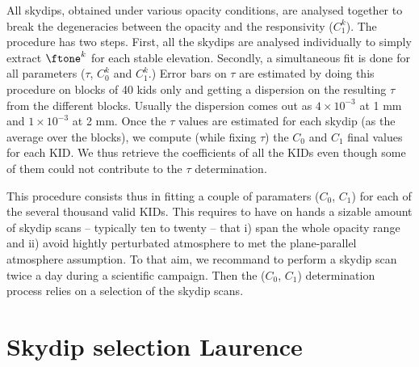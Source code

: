 All skydips, obtained under various opacity
conditions, are analysed together to break the degeneracies between
the opacity and the responsivity ($C_1^k$). The procedure has two steps.
First, all the skydips are analysed individually to simply extract
$\ftone^k$ for each stable elevation. Secondly, a simultaneous fit is done
for all 
parameters ($\tau$, $C_0^k$ and $C_1^k$.)
Error bars on $\tau$ are estimated by doing
this procedure on blocks of 40 kids only and getting a dispersion on the
resulting $\tau$ from the different blocks. Usually the dispersion comes out as
$4\times 10^{-3}$ at 1 mm and $1\times 10^{-3}$ at 2 mm. Once the $\tau$ values
are estimated for each skydip (as the average over the blocks), we compute
(while fixing $\tau$) the $C_0$ and $C_1$ final values for each KID. We thus
retrieve the coefficients of all the KIDs even though some of them could not
contribute to the $\tau$ determination.

This procedure consists thus in fitting a couple of paramaters ($C_0$,
$C_1$) for each of the several thousand valid KIDs. This requires to
have on hands a sizable amount of skydip scans -- typically ten to
twenty -- that i) span the whole opacity range and ii) avoid hightly
perturbated atmosphere to met the plane-parallel atmosphere
assumption. To that aim, we recommand to perform a skydip scan twice a
day during a scientific campaign. Then the ($C_0$, $C_1$)
determination process relies on a selection of the skydip scans.




\section{Skydip selection {\color{blue} Laurence}}
\label{se:skydip-selection}

